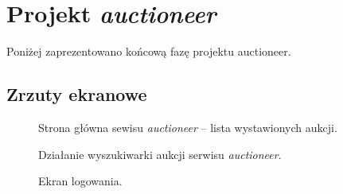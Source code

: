 \section{Projekt \textit{auctioneer}}

Poniżej zaprezentowano końcową fazę projektu auctioneer.

\subsection{Zrzuty ekranowe}

\begin{figure}[h]
\centering
{}
\caption{Strona główna sewisu \textit{auctioneer} -- lista wystawionych aukcji.}
\end{figure}

\begin{figure}[h]
\centering
{}
\caption{Działanie wyszukiwarki aukcji serwisu \textit{auctioneer}.}
\end{figure}

\begin{figure}[h]
\centering
{}
\caption{Ekran logowania.}
\end{figure}

